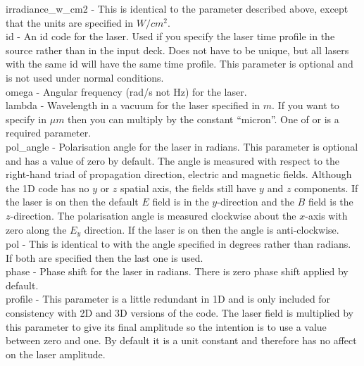 {\emphtext irradiance\_w\_cm2} - This is identical to the 
 parameter described above, except that the units
are specified in $W/cm^2$.\\

{\emphtext id} - An id code for the laser. Used if you specify the laser time
profile in the {\EPOCH} source rather than in the input deck. Does not have to
be unique, but all lasers with the same id will have the same time profile.
This parameter is optional and is not used under normal conditions.\\

{\emphtext omega} - Angular frequency (rad/s not Hz) for the laser.\\

{\emphtext lambda} - Wavelength in a vacuum for the laser specified in $m$.
If you want to specify in $\mu m$ then you can multiply by the constant
``micron''. One of  or  is a
required parameter.\\

{\emphtext pol\_angle} - Polarisation angle for the laser in radians.
This parameter is optional and has a value of zero by default.
The angle is measured with respect to the right-hand triad of propagation
direction, electric and magnetic fields. Although the 1D code has no $y$
or $z$ spatial axis, the fields still have $y$ and $z$ components.
If the laser is on  then the default $E$ field is in
the $y$-direction and the $B$ field is the $z$-direction. The polarisation
angle is measured clockwise about the $x$-axis with zero along the $E_y$
direction. If the laser is on  then the angle is
anti-clockwise.\\

{\emphtext pol} - This is identical to  with the angle
specified in degrees rather than radians. If both are specified then the
last one is used.\\

{\emphtext phase} - Phase shift for the laser in radians. 
There is zero phase shift applied by default.\\

{\emphtext profile} - This parameter is a little redundant in 1D and is
only included for consistency with 2D and 3D versions of the code.
The laser field is multiplied by this parameter to give its final amplitude
so the intention is to use a value between zero and one. By default it is a
unit constant and therefore has no affect on the laser amplitude.\\

